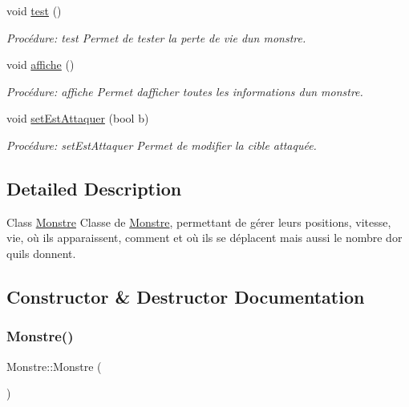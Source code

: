 \begin{DoxyCompactItemize}
void \hyperlink{classMonstre_a4f22d17531f5ca164355740d035485ee}{test} ()
\begin{DoxyCompactList}\small\item\em Procédure\+: test Permet de tester la perte de vie d\textquotesingle{}un monstre. \end{DoxyCompactList}\item 
void \hyperlink{classMonstre_ac6700482d005ec983746983f76ad0088}{affiche} ()
\begin{DoxyCompactList}\small\item\em Procédure\+: affiche Permet d\textquotesingle{}afficher toutes les informations d\textquotesingle{}un monstre. \end{DoxyCompactList}\item 
void \hyperlink{classMonstre_a74cb4551bed1c53c3071b965907050b0}{set\+Est\+Attaquer} (bool b)
\begin{DoxyCompactList}\small\item\em Procédure\+: set\+Est\+Attaquer Permet de modifier la cible attaquée. \end{DoxyCompactList}\end{DoxyCompactItemize}


\subsection{Detailed Description}
Class \hyperlink{classMonstre}{Monstre} Classe de \hyperlink{classMonstre}{Monstre}, permettant de gérer leurs positions, vitesse, vie, où ils apparaissent, comment et où ils se déplacent mais aussi le nombre d\textquotesingle{}or qu\textquotesingle{}ils donnent. 

\subsection{Constructor \& Destructor Documentation}
\mbox{\label{classMonstre_a8efe47ee8ea4b5ee8e5d3820e620059b}} 
\subsubsection{\texorpdfstring{Monstre()}{Monstre()}\hspace{0.1cm}{\footnotesize\ttfamily [1/3]}}
{\footnotesize\ttfamily Monstre\+::\+Monstre (\begin{DoxyParamCaption}{ }\end{DoxyParamCaption})}



